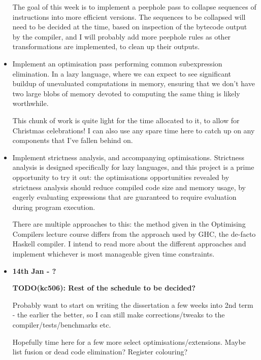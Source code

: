 \documentclass[12pt]{article}
\newcommand\todo[1]{\textbf{TODO(kc506): #1}}
\begin{document}
\begin{itemize}
{    The goal of this week is to implement a peephole pass to collapse sequences of instructions into more efficient
    versions. The sequences to be collapsed will need to be decided at the time, based on inspection of the bytecode
    output by the compiler, and I will probably add more peephole rules as other transformations are implemented, to clean
    up their outputs.
}
\item
{

    Implement an optimisation pass performing common subexpression elimination. In a lazy language, where we can expect
    to see significant buildup of unevaluated computations in memory, ensuring that we don't have two large blobs of
    memory devoted to computing the same thing is likely worthwhile.

    This chunk of work is quite light for the time allocated to it, to allow for Christmas celebrations! I can also use
    any spare time here to catch up on any components that I've fallen behind on.
}
\item
{

    Implement strictness analysis, and accompanying optimisations. Strictness analysis is designed specifically for lazy
    languages, and this project is a prime opportunity to try it out: the optimisations opportunities revealed by
    strictness analysis should reduce compiled code size and memory usage, by eagerly evaluating expressions that are
    guaranteed to require evaluation during program execution.

    There are multiple approaches to this: the method given in the Optimising Compilers lecture course differs from the
    approach used by GHC, the de-facto Haskell compiler. I intend to read more about the different approaches and
    implement whichever is most manageable given time constraints.
}
\item
{
    \textbf{14th Jan - ?}

    \todo{Rest of the schedule to be decided?}

    Probably want to start on writing the dissertation a few weeks into 2nd term - the earlier the better, so I can
    still make corrections/tweaks to the compiler/tests/benchmarks etc.

    Hopefully time here for a few more select optimisations/extensions. Maybe list fusion or dead code elimination?
    Register colouring?
}
\end{itemize}
\end{document}
